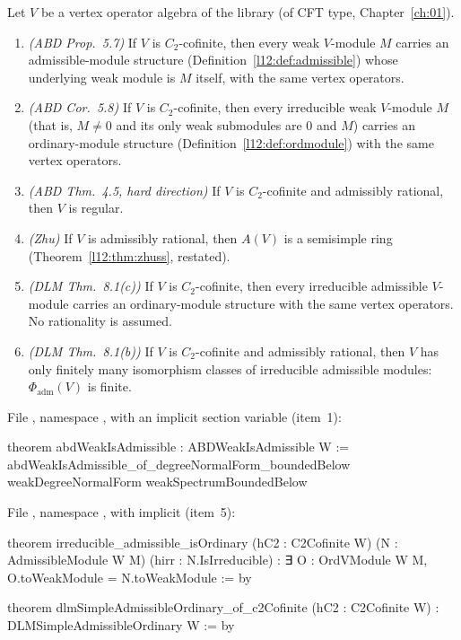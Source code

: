 \begin{theorem}\label{l12:thm:litproved}
Let $V$ be a vertex operator algebra of the library (of CFT type, Chapter~\ref{ch:01}).
\begin{enumerate}
\item \emph{(ABD Prop.~5.7)} If $V$ is $C_2$-cofinite, then every weak $V$-module $M$ carries an admissible-module structure
  (Definition~\ref{l12:def:admissible}) whose underlying weak module is $M$ itself, with the same vertex operators.
\item \emph{(ABD Cor.~5.8)} If $V$ is $C_2$-cofinite, then every irreducible weak $V$-module $M$ (that is, $M\neq0$ and its only
  weak submodules are $0$ and $M$) carries an ordinary-module structure (Definition~\ref{l12:def:ordmodule}) with the same
  vertex operators.
\item \emph{(ABD Thm.~4.5, hard direction)} If $V$ is $C_2$-cofinite and admissibly rational, then $V$ is regular.
\item \emph{(Zhu)} If $V$ is admissibly rational, then $A(V)$ is a semisimple ring (Theorem~\ref{l12:thm:zhuss}, restated).
\item \emph{(DLM Thm.~8.1(c))} If $V$ is $C_2$-cofinite, then every irreducible admissible $V$-module carries an
  ordinary-module structure with the same vertex operators. No rationality is assumed.
\item \emph{(DLM Thm.~8.1(b))} If $V$ is $C_2$-cofinite and admissibly rational, then $V$ has only finitely many isomorphism
  classes of irreducible admissible modules: $\Phi_{\mathrm{adm}}(V)$ is finite.
\end{enumerate}
\end{theorem}
\noindent File , namespace
, with  an implicit section variable (item~1):
\begin{leancode}
theorem abdWeakIsAdmissible : ABDWeakIsAdmissible W :=
  abdWeakIsAdmissible_of_degreeNormalForm_boundedBelow
    weakDegreeNormalForm weakSpectrumBoundedBelow
\end{leancode}
\noindent File , namespace
, with  implicit (item~5):
\begin{leancode}
theorem irreducible_admissible_isOrdinary (hC2 : C2Cofinite W)
    (N : AdmissibleModule W M) (hirr : N.IsIrreducible) :
    ∃ O : OrdVModule W M, O.toWeakModule = N.toWeakModule := by

theorem dlmSimpleAdmissibleOrdinary_of_c2Cofinite (hC2 : C2Cofinite W) :
    DLMSimpleAdmissibleOrdinary W := by
\end{leancode}
